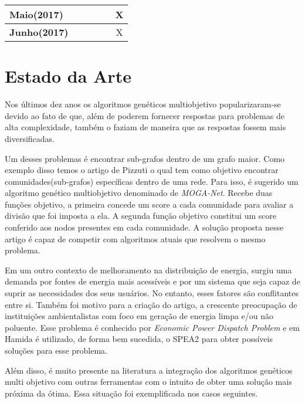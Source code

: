 \documentclass[12pt, %
openright, 
oneside, %
a4paper,    %
brazil]{facom-ufu-abntex2}
\begin{document}
\begin{table}[!h]
\begin{tabular}{|l|c|c|c|c|c|}
	\textbf{Maio(2017)}                   &                 &                                      &                                  &                                       & X                               \\ \hline
	\textbf{Junho(2017)}                   &                 &                                      &                                  &                                       & X                               \\ \hline
	\end{tabular}
	\end{table}

\chapter*[Estado da Arte]{Estado da Arte}
	Nos últimos dez anos os algoritmos genéticos multiobjetivo popularizaram-se devido ao fato de que, além de poderem fornecer respostas para problemas de alta complexidade, também o faziam de maneira que as respostas fossem mais diversificadas.
    
    Um desses problemas é encontrar sub-grafos dentro de um grafo maior. Como exemplo disso temos o artigo de Pizzuti\cite{MOGA-NET} o qual tem como objetivo encontrar comunidades(sub-grafos) específicas dentro de uma rede. Para isso, é sugerido um algoritmo genético multiobjetivo denominado de \textit{MOGA-Net}. Recebe duas funções objetivo, a primeira concede um score a cada comunidade para avaliar a divisão que foi imposta a ela. A segunda função objetivo constitui um score conferido aos nodos presentes em cada comunidade. A solução proposta nesse artigo é capaz de competir com algoritmos atuais que resolvem o mesmo problema.
	
    Em um outro contexto de melhoramento na distribuição de energia, surgiu uma demanda por fontes de energia mais acessíveis e por um sistema que seja capaz de suprir as necessidades dos seus usuários. No entanto, esses fatores são conflitantes entre si. Também foi motivo para a criação do artigo, a crescente preocupação de instituições ambientalistas com foco em geração de energia limpa e/ou não poluente. Esse problema é conhecido por \textit{Economic Power Dispatch Problem} e em Hamida \cite{EnergyDispatchSPEA2} é utilizado, de forma bem sucedida, o SPEA2 para obter possíveis soluções para esse problema. 
    
    Além disso, é muito presente na literatura a integração dos algoritmos genéticos multi objetivo com outras ferramentas com o intuito de obter uma solução mais próxima da ótima. Essa situação foi exemplificada nos casos seguintes.
    
\end{document}
